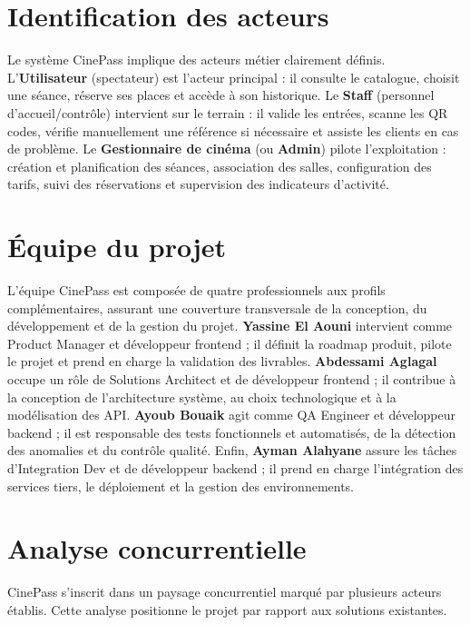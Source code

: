 \documentclass[12pt]{report}
\begin{document}
\section{Identification des acteurs}
Le système CinePass implique des acteurs métier clairement définis. L'\textbf{Utilisateur} (spectateur) est l'acteur principal : il consulte le catalogue, choisit une séance, réserve ses places et accède à son historique. Le \textbf{Staff} (personnel d'accueil/contrôle) intervient sur le terrain : il valide les entrées, scanne les QR codes, vérifie manuellement une référence si nécessaire et assiste les clients en cas de problème. Le \textbf{Gestionnaire de cinéma} (ou \textbf{Admin}) pilote l'exploitation : création et planification des séances, association des salles, configuration des tarifs, suivi des réservations et supervision des indicateurs d'activité.

\section{Équipe du projet}
L'équipe CinePass est composée de quatre professionnels aux profils complémentaires, assurant une couverture transversale de la conception, du développement et de la gestion du projet. \textbf{Yassine El Aouni} intervient comme Product Manager et développeur frontend ; il définit la roadmap produit, pilote le projet et prend en charge la validation des livrables. \textbf{Abdessami Aglagal} occupe un rôle de Solutions Architect et de développeur frontend ; il contribue à la conception de l'architecture système, au choix technologique et à la modélisation des API. \textbf{Ayoub Bouaik} agit comme QA Engineer et développeur backend ; il est responsable des tests fonctionnels et automatisés, de la détection des anomalies et du contrôle qualité. Enfin, \textbf{Ayman Alahyane} assure les tâches d'Integration Dev et de développeur backend ; il prend en charge l'intégration des services tiers, le déploiement et la gestion des environnements.

\section{Analyse concurrentielle}
CinePass s'inscrit dans un paysage concurrentiel marqué par plusieurs acteurs établis. Cette analyse positionne le projet par rapport aux solutions existantes.
\end{document}
